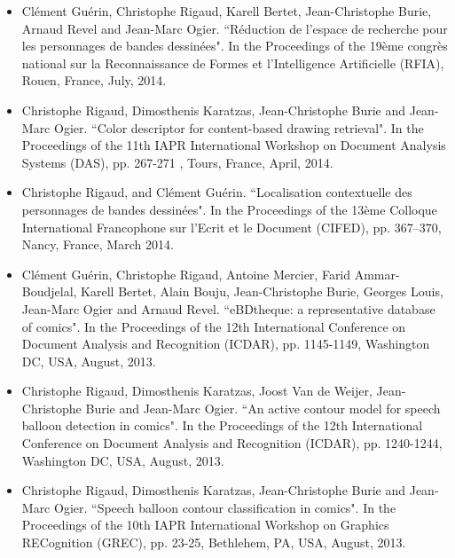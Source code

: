 \begin{itemize}

\item Cl{\'e}ment Gu{\'e}rin, Christophe Rigaud, Karell Bertet, Jean-Christophe Burie, Arnaud Revel and Jean-Marc Ogier. ``R{\'e}duction de l'espace de recherche pour les personnages de bandes dessin{\'e}es". In the Proceedings of the 19{\`e}me congr{\`e}s national sur la Reconnaissance de Formes et l'Intelligence Artificielle (RFIA), Rouen, France, July, 2014.
\vspace*{.3cm}

\item Christophe Rigaud, Dimosthenis Karatzas, Jean-Christophe Burie and Jean-Marc Ogier. ``Color descriptor for content-based drawing retrieval". In the Proceedings of the 11th IAPR International Workshop on Document Analysis Systems (DAS), pp. 267-271 , Tours, France, April, 2014.
\vspace*{.3cm}

\item Christophe Rigaud, and Cl{\'e}ment Gu{\'e}rin. ``Localisation contextuelle des personnages de bandes dessinées". In the Proceedings of the 13{\`e}me Colloque International Francophone sur l'Ecrit et le Document (CIFED), pp. 367–370, Nancy, France, March 2014.
\vspace*{.3cm}

\item Cl{\'e}ment Gu{\'e}rin, Christophe Rigaud, Antoine Mercier, Farid Ammar-Boudjelal, Karell Bertet, Alain Bouju, Jean-Christophe Burie, Georges Louis, Jean-Marc Ogier and Arnaud Revel. ``eBDtheque: a representative database of comics". In the Proceedings of the 12th International Conference on Document Analysis and Recognition (ICDAR), pp. 1145-1149, Washington DC, USA, August, 2013.
\vspace*{.3cm}

\item Christophe Rigaud, Dimosthenis Karatzas, Joost Van de Weijer, Jean-Christophe Burie and Jean-Marc Ogier. ``An active contour model for speech balloon detection in comics". In the Proceedings of the 12th International Conference on Document Analysis and Recognition (ICDAR), pp. 1240-1244, Washington DC, USA, August, 2013.
\vspace*{.3cm}

\item Christophe Rigaud, Dimosthenis Karatzas, Jean-Christophe Burie and Jean-Marc Ogier. ``Speech balloon contour classification in comics". In the Proceedings of the 10th IAPR International Workshop on Graphics RECognition (GREC), pp. 23-25, Bethlehem, PA, USA, August, 2013.
\vspace*{.3cm}


\end{itemize}
